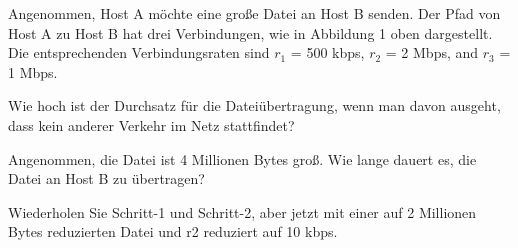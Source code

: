 \Aufgabenstellung%
Angenommen, Host A möchte eine große Datei an Host B senden. Der Pfad von Host A
zu Host B hat drei Verbindungen, wie in Abbildung 1 oben dargestellt. Die entsprechenden
Verbindungsraten sind $r_1$ = 500 kbps, $r_2$ = 2 Mbps, and $r_3$ = 1 Mbps.


\Teilaufgabe%
Wie hoch ist der Durchsatz für die Dateiübertragung, wenn man davon ausgeht,
dass kein anderer Verkehr im Netz stattfindet?


\Teilaufgabe%
Angenommen, die Datei ist 4 Millionen Bytes groß. Wie lange dauert es, die Datei
an Host B zu übertragen?


\Teilaufgabe%
Wiederholen Sie Schritt-1 und Schritt-2, aber jetzt mit einer auf 2 Millionen Bytes
reduzierten Datei und r2 reduziert auf 10 kbps.







